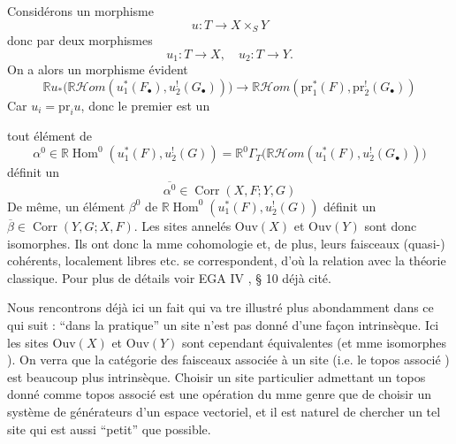 \deleted{\unsure{\S}}
Considérons un morphisme
\[
u:T\longrightarrow X\times_S Y
\]
 donc par deux morphismes
\[
u_1:T\longrightarrow X,\quad u_2:T\longrightarrow Y.
\]
On a alors un morphisme évident
\[
\mathbb{R}u_*\bigl(\mathbb{R}\mathcal{H}om(u_1^*(F_\bullet),u_2^!(G_\bullet))\bigr)
\longrightarrow\mathbb{R}\mathcal{H}om(\mathrm{pr}_1^*(F),\mathrm{pr}_2^!(G_\bullet))
\]
Car $u_i=\mathrm{pr}_i u$, donc le premier est un

 tout élément de 
\[
\alpha^0\in\mathbb{R}\operatorname{Hom}^{0}(u_1^*(F),u_2^!(G))
=\mathbb{R}^{0}\Gamma_T\bigl(\mathbb{R}\mathcal{H}om(u_1^*(F),u_2^!(G_\bullet))\bigr)
\]
définit un 
\[
\overline{\alpha^0}\in\operatorname{Corr}(X,F;Y,G)
\]
De même, un élément $\beta^0$ de $\mathbb{R}\operatorname{Hom}^{0}(u_1^*(F),u_2^!(G))$ définit un  $\overline{\beta}\in\operatorname{Corr}(Y,G;X,F)$.
Les sites annelés $\mathrm{Ouv}(X)$ et $\mathrm{Ouv}(Y)$ sont donc isomorphes. Ils ont donc la mme cohomologie et, de plus, leurs faisceaux (quasi-) cohérents, localement libres etc. se correspondent, d'où la relation avec la théorie classique. Pour plus de détails voir \inserted{[}EGA IV , § 10\inserted{]} déjà cité.

Nous rencontrons déjà ici un fait qui va tre illustré plus abondamment dans ce qui suit : ``dans la pratique'' un site n'est pas donné d'une façon intrinsèque. Ici les sites $\mathrm{Ouv}(X)$ et $\mathrm{Ouv}(Y)$ sont cependant équivalentes (et mme isomorphes ). On verra que la catégorie des faisceaux associée à un site (i.e. le topos associé ) est beaucoup plus intrinsèque. Choisir un site particulier admettant un topos donné comme topos associé est une opération du mme genre que de choisir un système de générateurs d'un espace vectoriel, et il est naturel de chercher un tel site qui est aussi ``petit'' que possible.

